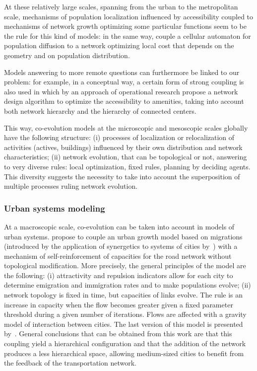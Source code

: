 At these relatively large scales, spanning from the urban to the metropolitan scale, mechanisms of population localization influenced by accessibility coupled to mechanisms of network growth optimizing some particular functions seem to be the rule for this kind of models: in the same way, \cite{wu2017city} couple a cellular automaton for population diffusion to a network optimizing local cost that depends on the geometry and on population distribution.


Models answering to more remote questions can furthermore be linked to our problem: for example, in a conceptual way, a certain form of strong coupling is also used in \citep{bigotte2010integrated} which by an approach of operational research propose a network design algorithm to optimize the accessibility to amenities, taking into account both network hierarchy and the hierarchy of connected centers.


This way, co-evolution models at the microscopic and mesoscopic scales globally have the following structure: (i) processes of localization or relocalization of activities (actives, buildings) influenced by their own distribution and network characteristics; (ii) network evolution, that can be topological or not, answering to very diverse rules: local optimization, fixed rules, planning by deciding agents. This diversity suggests the necessity to take into account the superposition of multiple processes ruling network evolution.


\subsubsection{Urban systems modeling}

At a macroscopic scale, co-evolution can be taken into account in models of urban systems. \cite{baptiste1999interactions} propose to couple an urban growth model based on migrations (introduced by the application of synergetics to systems of cities by~\citep{sanders1992systeme}) with a mechanism of self-reinforcement of capacities for the road network without topological modification. More precisely, the general principles of the model are the following: (i) attractivity and repulsion indicators allow for each city to determine emigration and immigration rates and to make populations evolve; (ii) network topology is fixed in time, but capacities of links evolve. The rule is an increase in capacity when the flow becomes greater given a fixed parameter threshold during a given number of iterations. Flows are affected with a gravity model of interaction between cities. The last version of this model is presented by~\cite{baptistemodeling}. General conclusions that can be obtained from this work are that this coupling yield a hierarchical configuration and that the addition of the network produces a less hierarchical space, allowing medium-sized cities to benefit from the feedback of the transportation network.

